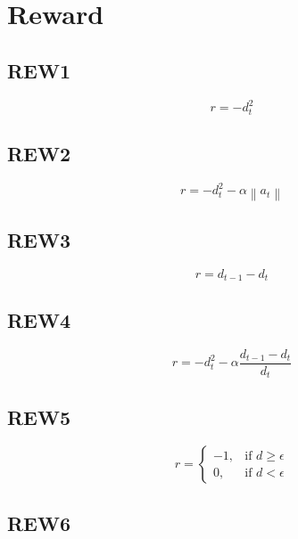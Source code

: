 \documentclass{article}
\newcommand{\norm}[1]{\left\lVert#1\right\rVert}
\begin{document}
\section{Reward}



\subsection*{REW1} 

\begin{equation}
r = - d_t^2
\end{equation}

\subsection*{REW2} 

\begin{equation}
r = - d_t^2 - \alpha \norm{a_t}
\end{equation}

\subsection*{REW3} 

\begin{equation}
r = d_{t-1} - d_t
\end{equation}

\subsection*{REW4} 

\begin{equation}
r = - d_t^2 - \alpha \frac{d_{t-1} - d_t}{d_t}
\end{equation}

\subsection*{REW5} 

\begin{equation}
r = \begin{cases}
    -1, & \text{if $d \geq \epsilon $}\\
    0, & \text{if $d < \epsilon $}
  \end{cases}
\end{equation}

\subsection*{REW6} 
\end{document}
